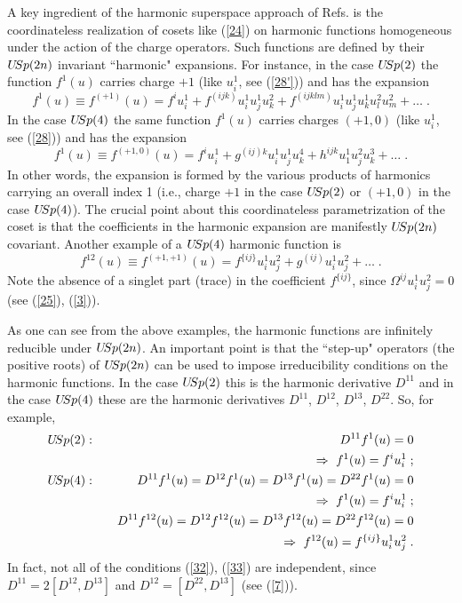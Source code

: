 \documentclass[a4paper,12pt]{article}
\begin{document}
A key ingredient of the harmonic superspace approach of Refs.  
\cite{GIKOS} is the coordinateless realization of cosets like 
(\ref{24}) on harmonic functions homogeneous under the action of 
the charge operators. Such functions are defined by their 
$U\hskip-2pt Sp(2n)$ invariant ``harmonic" expansions. For 
instance, in the case $U\hskip-2pt Sp(2)$ the function $f^1(u)$ 
carries charge $+1$ (like $u^1_i$, see (\ref{28'})) and has the 
expansion 
\begin{equation}\label{29}
 f^1(u)\equiv f^{(+1)}(u) = f^iu^1_i + f^{(ijk)}u^1_iu^1_ju^2_k + 
f^{(ijklm)}u^1_iu^1_ju^1_ku^2_lu^2_m + \ldots\;. 
\end{equation}
In the case $U\hskip-2pt Sp(4)$ the same function $f^1(u)$ carries 
charges $(+1,0)$ (like $u^1_i$, see (\ref{28})) and has the 
expansion    
\begin{equation}\label{30}
  f^1(u)\equiv f^{(+1,0)}(u)  = f^iu^1_i +  g^{(ij)k}u^1_iu^1_ju^4_k + 
h^{ijk}u^1_1u^2_ju^3_k + \ldots\;. 
\end{equation}
In other words, the expansion is formed by the various products of 
harmonics carrying an overall index 1 (i.e., charge $+1$ in the 
case $U\hskip-2pt Sp(2)$ or $(+1,0)$ in the case $U\hskip-2pt 
Sp(4)$). The crucial point about this coordinateless 
parametrization of the coset is that the coefficients in the 
harmonic expansion are manifestly $U\hskip-2pt Sp(2n)$ covariant. 
Another example of a $U\hskip-2pt Sp(4)$ harmonic function is 
\begin{equation}\label{30'}
  f^{12}(u)\equiv f^{(+1,+1)}(u)  = f^{\{ij\}}u^1_iu^2_j +  
g^{(ij)}u^1_iu^2_j +\ldots\;.
\end{equation}
Note the absence of a singlet part (trace) in the coefficient 
$f^{\{ij\}}$, since $\Omega^{ij}u^1_iu^2_j=0$ (see (\ref{25}), 
(\ref{3})). 

As one can see from the above examples, the harmonic functions are 
infinitely reducible under $U\hskip-2pt Sp(2n)$. An important 
point is that the ``step-up" operators (the positive roots) of 
$U\hskip-2pt Sp(2n)$ can be used to impose irreducibility 
conditions on the harmonic functions. In the case $U\hskip-2pt 
Sp(2)$ this is the harmonic derivative $D^{11}$ and in the case 
$U\hskip-2pt Sp(4)$ these are the harmonic derivatives $D^{11}$,  
$D^{12}$,  $D^{13}$,  $D^{22}$. So, for example, 
\begin{eqnarray}
  U\hskip-2pt Sp(2): &\quad& D^{11}f^1(u) = 0  \nonumber\\
     &\quad& \Rightarrow \ f^1(u) = f^iu^1_i \;; \label{31} \\
  U\hskip-2pt Sp(4): &\quad& D^{11}f^1(u) =  D^{12}f^1(u) =  D^{13}f^1(u) =  D^{22}f^1(u) = 0 
\nonumber\\ 
        &\quad& \Rightarrow \ f^1(u) = f^iu^1_i\;; \label{32}\\
&\quad& D^{11}f^{12}(u) =  D^{12}f^{12}(u) =  D^{13}f^{12}(u) =  
D^{22}f^{12}(u) = 0 \nonumber\\ 
        &\quad& \Rightarrow \ f^{12}(u) = f^{\{ij\}}u^1_iu^2_j\;. \label{33}  
\end{eqnarray}
In fact, not all of the conditions (\ref{32}), (\ref{33}) are 
independent, since $D^{11}=2[D^{12},D^{13}]$ and 
$D^{12}=[D^{22},D^{13}]$ (see (\ref{7})). 
\end{document}
